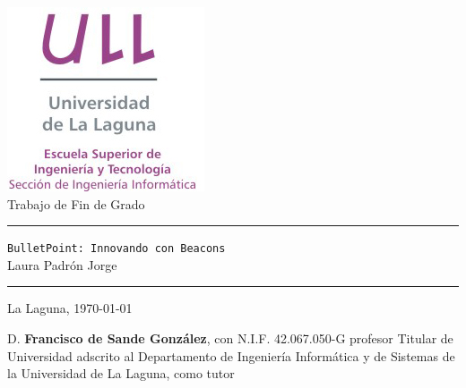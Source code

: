 \documentclass[spanish,a4paper,14pt,oneside]{extreport}
\newcommand{\BulletPoint}{\texttt{BulletPoint:{ Innovando con Beacons}}}
\begin{document}
\renewcommand{\lstlistingname}{Listado}%

\pagestyle{empty}
\thispagestyle{empty}


\newcommand{\HRule}{\rule{\linewidth}{1mm}}
\setlength{\parindent}{0mm}
\setlength{\parskip}{0mm}


\begin{center}
\includegraphics[scale=0.8]{images/logo_vertical}\\[10mm]
{\Huge Trabajo de Fin de Grado}
\end{center}

\HRule
\begin{flushright}
        {\Huge \BulletPoint{}} \\[2.5mm]
        {\Large Laura Padrón Jorge} \\[5mm]


\end{flushright}
\HRule
{}
\begin{center}
  \Large La Laguna, \today
\end{center}

\setlength{\parindent}{5mm}

\newpage
\thispagestyle{empty}

D. {\bf Francisco de Sande González}, con N.I.F. 42.067.050-G
profesor
Titular de Universidad
adscrito al Departamento
de Ingeniería Informática y de Sistemas
de la Universidad de La Laguna, como tutor
\end{document}
